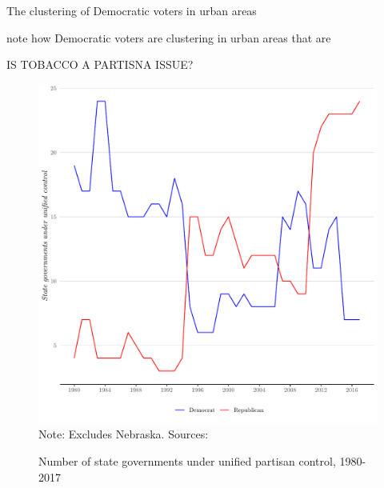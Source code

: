 \documentclass[12pt]{article}
\begin{document}
The clustering of Democratic voters in urban areas 



\textcite{chenUnintentionalGerrymanderingPolitical2013} note how Democratic voters are clustering in urban areas that are 


IS TOBACCO A PARTISNA ISSUE? 



\begin{figure}[ht]
\caption{Number of state governments under unified partisan control, 1980-2017}
\centering
\includegraphics[width=.75\textwidth]{plots/party_control}
\newline\scriptsize{Note: Excludes Nebraska. Sources: \textcite{jordanCorrelatesStatePolicy2017,nationalconferenceofstatelegislaturesStatePartisanComposition2019}}
\end{figure}









\newpage
\singlespacing
\printbibliography
 
\end{document}
